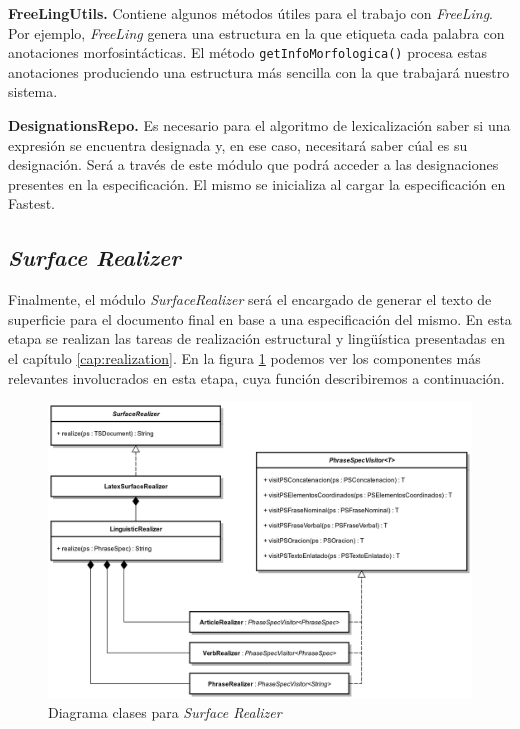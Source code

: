 \bigskip
\noindent
\textbf{FreeLingUtils.} Contiene algunos métodos útiles para el trabajo con \textit{FreeLing}. Por ejemplo, \textit{FreeLing} genera una estructura en la que etiqueta cada palabra con anotaciones morfosintácticas. El método \texttt{getInfoMorfologica()} procesa estas anotaciones produciendo una estructura más sencilla con la que trabajará nuestro sistema.

\bigskip
\noindent
\textbf{DesignationsRepo.} Es necesario para el algoritmo de lexicalización saber si una expresión se encuentra designada y, en ese caso, necesitará saber cúal es su designación. Será a través de este módulo que podrá acceder a las designaciones presentes en la especificación. El mismo se inicializa al cargar la especificación en Fastest. 

\subsection{\textit{Surface Realizer}}

Finalmente, el módulo \emph{SurfaceRealizer} será el encargado de generar el texto de superficie para el documento final en base a una especificación del mismo. En esta etapa se realizan las tareas de realización estructural y lingüística presentadas en el capítulo \ref{cap:realization}. En la figura \ref{fig:imp_surfrealizer} podemos ver los componentes más relevantes involucrados en esta etapa, cuya función describiremos a continuación. 

\begin{figure}[H]
  	\centering
	\includegraphics[scale=0.20]{img/realizer_imp.png}
	\caption{Diagrama clases para \textit{Surface Realizer}}
  	\label{fig:imp_surfrealizer}
\end{figure}

